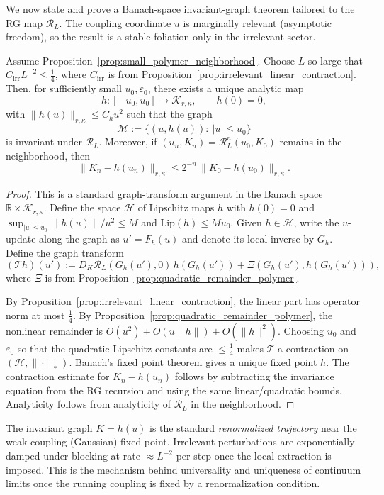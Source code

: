 We now state and prove a Banach-space invariant-graph theorem tailored to the RG map $\mathcal R_L$.
The coupling coordinate $u$ is marginally relevant (asymptotic freedom), so the result is a stable foliation only in the irrelevant sector.

\begin{theorem}\label{thm:rg_stable_manifold}
Assume Proposition~\ref{prop:small_polymer_neighborhood}.
Choose $L$ so large that $C_{\mathrm{irr}}L^{-2}\le \tfrac14$, where $C_{\mathrm{irr}}$ is from
Proposition~\ref{prop:irrelevant_linear_contraction}.
Then, for sufficiently small $u_0,\varepsilon_0$, there exists a unique analytic map
\[
 h:[-u_0,u_0]\to\mathcal K_{r,\kappa},\qquad h(0)=0,
\]
with $\|h(u)\|_{r,\kappa}\le C_h u^2$ such that the graph
\[
\mathcal M:=\{(u,h(u)):\ |u|\le u_0\}
\]
is invariant under $\mathcal R_L$.
Moreover, if $(u_n,K_n)=\mathcal R_L^n(u_0,K_0)$ remains in the neighborhood, then
\[
\|K_n-h(u_n)\|_{r,\kappa}\le 2^{-n}\,\|K_0-h(u_0)\|_{r,\kappa}.
\]
\end{theorem}

\begin{proof}
This is a standard graph-transform argument in the Banach space $\mathbb R\times\mathcal K_{r,\kappa}$.
Define the space $\mathcal H$ of Lipschitz maps $h$ with $h(0)=0$ and
$\sup_{|u|\le u_0}\|h(u)\|/u^2\le M$ and $\mathrm{Lip}(h)\le Mu_0$.
Given $h\in\mathcal H$, write the $u$-update along the graph as $u'=F_h(u)$ and denote its local inverse by $G_h$.
Define the graph transform
\[
(\mathcal T h)(u') := D_K\mathcal R_L(G_h(u'),0)\,h(G_h(u')) + \Xi(G_h(u'),h(G_h(u'))),
\]
where $\Xi$ is from Proposition~\ref{prop:quadratic_remainder_polymer}.

By Proposition~\ref{prop:irrelevant_linear_contraction}, the linear part has operator norm at most $\tfrac14$.
By Proposition~\ref{prop:quadratic_remainder_polymer}, the nonlinear remainder is $O(u^2)+O(u\|h\|)+O(\|h\|^2)$.
Choosing $u_0$ and $\varepsilon_0$ so that the quadratic Lipschitz constants are $\le \tfrac14$ makes $\mathcal T$ a contraction on
$(\mathcal H,\|\cdot\|_*)$.
Banach's fixed point theorem gives a unique fixed point $h$.
The contraction estimate for $K_n-h(u_n)$ follows by subtracting the invariance equation from the RG recursion and using the same linear/quadratic
bounds.
Analyticity follows from analyticity of $\mathcal R_L$ in the neighborhood.
\end{proof}

\begin{remark}[Interpretation]
The invariant graph $K=h(u)$ is the standard \emph{renormalized trajectory} near the weak-coupling (Gaussian) fixed point.
Irrelevant perturbations are exponentially damped under blocking at rate $\approx L^{-2}$ per step once the local extraction is imposed.
This is the mechanism behind universality and uniqueness of continuum limits once the running coupling is fixed by a renormalization condition.
\end{remark}


